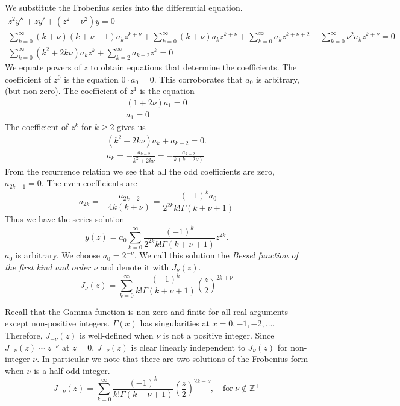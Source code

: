 We substitute the Frobenius series into the differential equation.
\begin{gather*}
  z^2 y'' + z y' + \left( z^2 - \nu^2 \right) y = 0 \\
  \sum_{k = 0}^\infty (k + \nu)(k + \nu - 1) a_k z^{k+\nu}
  + \sum_{k = 0}^\infty (k + \nu) a_k z^{k+\nu} + \sum_{k = 0}^\infty a_k z^{k+\nu+2}
  - \sum_{k = 0}^\infty \nu^2 a_k z^{k+\nu} = 0 \\
  \sum_{k = 0}^\infty \left( k^2 + 2 k \nu \right) a_k z^{k}
  + \sum_{k=2}^\infty a_{k-2} z^k = 0
\end{gather*}
We equate powers of $z$ to obtain equations that determine the coefficients.
The coefficient of $z^0$ is the equation $0 \cdot a_0 = 0$.
This corroborates that $a_0$ is arbitrary, (but non-zero).
The coefficient of $z^1$ is the equation
\begin{gather*}
  (1 + 2 \nu) a_1 = 0 \\
  a_1 = 0
\end{gather*}
The coefficient of $z^k$ for $k \geq 2$ gives us
\begin{gather*}
  \left( k^2 + 2 k \nu \right) a_k + a_{k-2} = 0. \\
  a_k = - \frac{a_{k-2}}{ k^2 + 2 k \nu } = - \frac{a_{k-2}}{ k (k + 2 \nu) }
\end{gather*}
From the recurrence relation we see that all the odd coefficients are zero,
$a_{2k+1} = 0$.  The even coefficients are
\[
a_{2 k} = - \frac{ a_{2k-2} }{ 4 k (k + \nu) }
= \frac{ (-1)^k a_0 }{ 2^{2k} k! \Gamma(k + \nu + 1) }
\]
Thus we have the series solution
\[
y(z) = a_0 \sum_{k = 0}^\infty \frac{ (-1)^k }{ 2^{2k} k! \Gamma(k + \nu + 1) }
z^{2k}.
\]
$a_0$ is arbitrary.  We choose $a_0 = 2^{-\nu}$.
We call this solution the \textit{Bessel function of the first kind
  and order $\nu$} and denote it with $J_\nu(z)$.
\[
J_\nu(z) = \sum_{k = 0}^\infty \frac{ (-1)^k }{ k! \Gamma(k + \nu + 1) }
\left( \frac{z}{2} \right)^{2 k + \nu}
\]


Recall that the Gamma function is non-zero and finite for all real arguments
except non-positive integers.  $\Gamma(x)$ has singularities at 
$x = 0, -1, -2, \ldots$.  Therefore, $J_{-\nu}(z)$ is well-defined
when $\nu$ is not a positive integer.  Since $J_{-\nu}(z) \sim z^{-\nu}$
at $z = 0$, $J_{-\nu}(z)$ is clear linearly independent to $J_\nu(z)$
for non-integer $\nu$.  In particular we note that there are two solutions
of the Frobenius form when $\nu$ is a half odd integer.
\[
J_{-\nu}(z) = \sum_{k = 0}^\infty \frac{ (-1)^k }{ k! \Gamma(k - \nu + 1) }
\left( \frac{z}{2} \right)^{2 k - \nu}, 
\quad \mathrm{for}\ \nu \not \in \mathbb{Z}^+
\]


